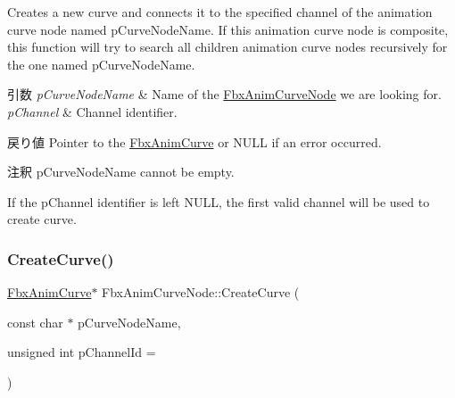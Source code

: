 Creates a new curve and connects it to the specified channel of the animation curve node named p\+Curve\+Node\+Name. If this animation curve node is composite, this function will try to search all children animation curve nodes recursively for the one named p\+Curve\+Node\+Name. 
\begin{DoxyParams}{引数}
{\em p\+Curve\+Node\+Name} & Name of the \hyperlink{class_fbx_anim_curve_node}{Fbx\+Anim\+Curve\+Node} we are looking for. \\
\hline
{\em p\+Channel} & Channel identifier. \\
\hline
\end{DoxyParams}
\begin{DoxyReturn}{戻り値}
Pointer to the \hyperlink{class_fbx_anim_curve}{Fbx\+Anim\+Curve} or N\+U\+LL if an error occurred. 
\end{DoxyReturn}
\begin{DoxyRemark}{注釈}
p\+Curve\+Node\+Name cannot be empty. 

If the p\+Channel identifier is left N\+U\+LL, the first valid channel will be used to create curve. 
\end{DoxyRemark}
\mbox{\label{class_fbx_anim_curve_node_a10fa606f04216696240ad9d1cc655985}} 
\subsubsection{\texorpdfstring{Create\+Curve()}{CreateCurve()}\hspace{0.1cm}{\footnotesize\ttfamily [2/2]}}
{\footnotesize\ttfamily \hyperlink{class_fbx_anim_curve}{Fbx\+Anim\+Curve}$\ast$ Fbx\+Anim\+Curve\+Node\+::\+Create\+Curve (\begin{DoxyParamCaption}\item[{const char $\ast$}]{p\+Curve\+Node\+Name,  }\item[{unsigned int}]{p\+Channel\+Id = {} }\end{DoxyParamCaption})}

